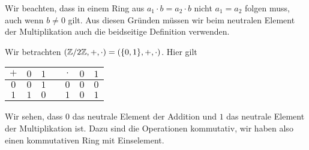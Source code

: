 Wir beachten, dass in einem Ring aus \(a_1 \cdot b = a_2 \cdot b\) nicht \(a_1=a_2\) folgen muss, auch wenn \(b\neq 0\) gilt. Aus diesen Gründen müssen wir beim neutralen Element der Multiplikation auch die beidseitige Definition verwenden.
\label{grundlagen/zahlensysteme:example-7}
\begin{example}{}{}



Wir betrachten \((\mathbb{Z}/2\mathbb{Z}, +,\cdot)=(\{0,1\},+,\cdot)\). Hier gilt


\begin{center}
\centering
\begin{tabularx}{\linewidth}[{\linewidth}]{|c|c|c|c|c|c|c|}\hline
 
\(+\)
& 
\(0\)
& 
\(1\)
&

& 
\(\cdot\)
& 
\(0\)
& 
\(1\)
\\
\hline
\(0\)
&
\(0\)
&
\(1\)
&

&
\(0\)
&
\(0\)
&
\(0\)
\\
\hline
\(1\)
&
\(1\)
&
\(0\)
&

&
\(1\)
&
\(0\)
&
\(1\)
\\
\hline
\end{tabularx}
\end{center}

Wir sehen, dass \(0\) das neutrale Element der Addition und \(1\) das neutrale Element der Multiplikation ist. Dazu sind die Operationen kommutativ, wir haben also einen kommutativen Ring mit Einselement.
\end{example}
\label{grundlagen/zahlensysteme:example-8}
